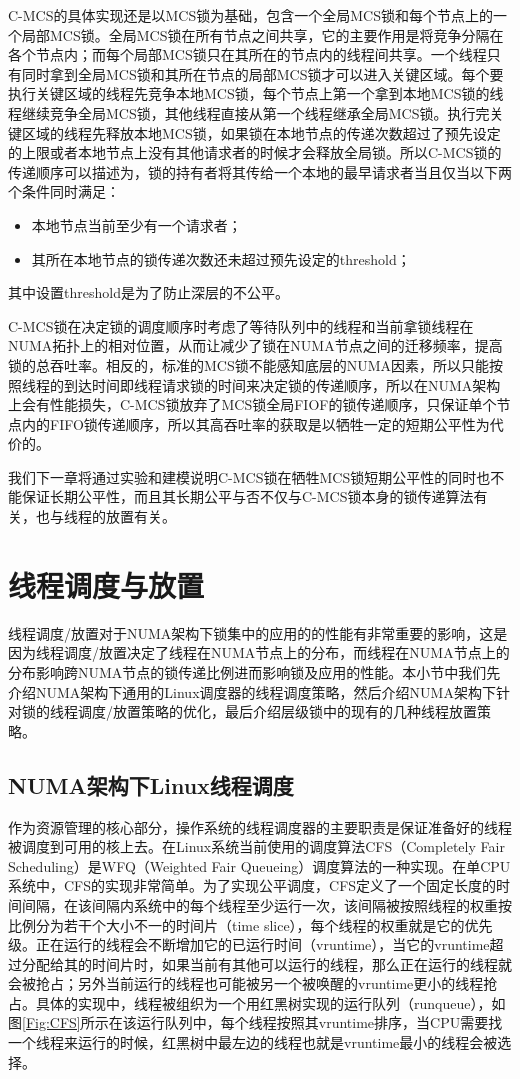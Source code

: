 C-MCS的具体实现还是以MCS锁为基础，包含一个全局MCS锁和每个节点上的一个局部MCS锁。全局MCS锁在所有节点之间共享，它的主要作用是将竞争分隔在各个节点内；而每个局部MCS锁只在其所在的节点内的线程间共享。一个线程只有同时拿到全局MCS锁和其所在节点的局部MCS锁才可以进入关键区域。每个要执行关键区域的线程先竞争本地MCS锁，每个节点上第一个拿到本地MCS锁的线程继续竞争全局MCS锁，其他线程直接从第一个线程继承全局MCS锁。执行完关键区域的线程先释放本地MCS锁，如果锁在本地节点的传递次数超过了预先设定的上限或者本地节点上没有其他请求者的时候才会释放全局锁。所以C-MCS锁的传递顺序可以描述为，锁的持有者将其传给一个本地的最早请求者当且仅当以下两个条件同时满足：
\begin{itemize}
\item  本地节点当前至少有一个请求者；
\item  其所在本地节点的锁传递次数还未超过预先设定的threshold；
\end{itemize}
其中设置threshold是为了防止深层的不公平。

C-MCS锁在决定锁的调度顺序时考虑了等待队列中的线程和当前拿锁线程在NUMA拓扑上的相对位置，从而让减少了锁在NUMA节点之间的迁移频率，提高锁的总吞吐率。相反的，标准的MCS锁不能感知底层的NUMA因素，所以只能按照线程的到达时间即线程请求锁的时间来决定锁的传递顺序，所以在NUMA架构上会有性能损失，C-MCS锁放弃了MCS锁全局FIOF的锁传递顺序，只保证单个节点内的FIFO锁传递顺序，所以其高吞吐率的获取是以牺牲一定的短期公平性为代价的。

我们下一章将通过实验和建模说明C-MCS锁在牺牲MCS锁短期公平性的同时也不能保证长期公平性，而且其长期公平与否不仅与C-MCS锁本身的锁传递算法有关，也与线程的放置有关。

\section{线程调度与放置}

线程调度/放置对于NUMA架构下锁集中的应用的的性能有非常重要的影响\cite{pusukuri2014shuffling}，这是因为线程调度/放置决定了线程在NUMA节点上的分布，而线程在NUMA节点上的分布影响跨NUMA节点的锁传递比例进而影响锁及应用的性能。本小节中我们先介绍NUMA架构下通用的Linux调度器的线程调度策略，然后介绍NUMA架构下针对锁的线程调度/放置策略的优化，最后介绍层级锁中的现有的几种线程放置策略。
\subsection{NUMA架构下Linux线程调度}
作为资源管理的核心部分，操作系统的线程调度器的主要职责是保证准备好的线程被调度到可用的核上去。在Linux系统当前使用的调度算法CFS（Completely Fair Scheduling）\cite{lozi2016linux}是WFQ（Weighted Fair Queueing）调度算法的一种实现。在单CPU系统中，CFS的实现非常简单。为了实现公平调度，CFS定义了一个固定长度的时间间隔，在该间隔内系统中的每个线程至少运行一次，该间隔被按照线程的权重按比例分为若干个大小不一的时间片（time slice），每个线程的权重就是它的优先级。正在运行的线程会不断增加它的已运行时间（vruntime），当它的vruntime超过分配给其的时间片时，如果当前有其他可以运行的线程，那么正在运行的线程就会被抢占；另外当前运行的线程也可能被另一个被唤醒的vruntime更小的线程抢占。具体的实现中，线程被组织为一个用红黑树实现的运行队列（runqueue），如图\ref{Fig:CFS}所示在该运行队列中，每个线程按照其vruntime排序，当CPU需要找一个线程来运行的时候，红黑树中最左边的线程也就是vruntime最小的线程会被选择。

